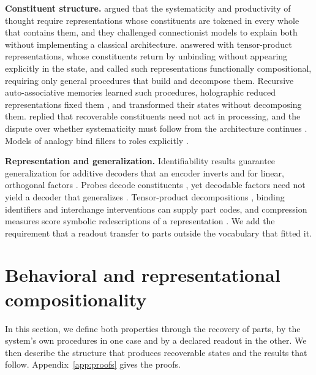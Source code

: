\textbf{Constituent structure.} \citet{fodor1988} argued that the systematicity and productivity of thought require representations whose constituents are tokened in every whole that contains them, and they challenged connectionist models to explain both without implementing a classical architecture. \citet{smolensky1987,smolensky1990} answered with tensor-product representations, whose constituents return by unbinding without appearing explicitly in the state, and \citet{vangelder1990} called such representations functionally compositional, requiring only general procedures that build and decompose them. Recursive auto-associative memories \citep{pollack1990} learned such procedures, holographic reduced representations fixed them \citep{plate1995}, and \citet{chalmers1990} transformed their states without decomposing them. \citet{fodor1990} replied that recoverable constituents need not act in processing, and the dispute over whether systematicity must follow from the architecture continues \citep{aizawa2003,quiltydunn2023,russin2024,woydt2025,goodale2026}. Models of analogy bind fillers to roles explicitly \citep{hummel1997,doumas2022}.

\textbf{Representation and generalization.} Identifiability results guarantee generalization for additive decoders that an encoder inverts \citep{brady2023,lachapelle2023,wiedemer2024} and for linear, orthogonal factors \citep{uselis2026}. Probes decode constituents \citep{bernardi2020,redhardt2025}, yet decodable factors need not yield a decoder that generalizes \citep{montero2021,schott2022}. Tensor-product decompositions \citep{mccoy2019,soulos2020}, binding identifiers \citep{feng2024} and interchange interventions \citep{geiger2021,geiger2024das} can supply part codes, and compression measures score symbolic redescriptions of a representation \citep{andreas2019,elmoznino2024,elmoznino2026}. We add the requirement that a readout transfer to parts outside the vocabulary that fitted it.

\section{Behavioral and representational compositionality}
\label{sec:definition}

In this section, we define both properties through the recovery of parts, by the system's own procedures in one case and by a declared readout in the other. We then describe the structure that produces recoverable states and the results that follow. Appendix~\ref{app:proofs} gives the proofs.

